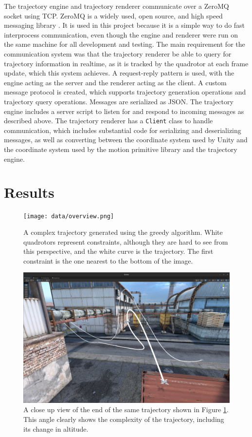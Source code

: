 \documentclass[pageno]{jpaper}
\begin{document}
The trajectory engine and trajectory renderer communicate over a ZeroMQ socket using TCP. ZeroMQ is a widely used, open source, and high speed messaging library \cite{zmq}. It is used in this project because it is a simple way to do fast interprocess communication, even though the engine and renderer were run on the same machine for all development and testing. The main requirement for the communication system was that the trajectory renderer be able to query for trajectory information in realtime, as it is tracked by the quadrotor at each frame update, which this system achieves. A request-reply pattern is used, with the engine acting as the server and the renderer acting as the client. A custom message protocol is created, which supports trajectory generation operations and trajectory query operations. Messages are serialized as JSON. The trajectory engine includes a server script to listen for and respond to incoming messages as described above. The trajectory renderer has a \texttt{Client} class to handle communication, which includes substantial code for serializing and deserializing messages, as well as converting between the coordinate system used by Unity and the coordinate system used by the motion primitive library and the trajectory engine.

\section{Results}

\begin{figure}
  \centering
  \texttt{[image: data/overview.png]}
  \caption{A complex trajectory generated using the greedy algorithm. White quadrotors represent constraints, although they are hard to see from this perspective, and the white curve is the trajectory. The first constraint is the one nearest to the bottom of the image.}
  \label{fig:overview}
\end{figure}

\begin{figure}
  \centering
  \includegraphics[width=0.75\linewidth]{data/landing.png}
  \caption{A close up view of the end of the same trajectory shown in Figure \ref{fig:overview}. This angle clearly shows the complexity of the trajectory, including its change in altitude.}
  \label{fig:landing}
\end{figure}
\end{document}
